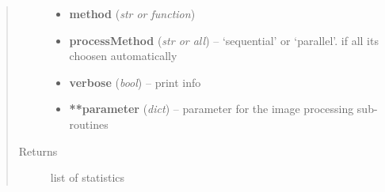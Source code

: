 \documentclass[letterpaper,10pt,english]{sphinxmanual}
\begin{document}
\begin{fulllineitems}
\begin{quote}
\begin{description}
\begin{itemize}
\item {} 
\textbf{method} (\emph{str or function})

\item {} 
\textbf{processMethod} (\emph{str or all}) --
`sequential' or `parallel'. if all its choosen automatically

\item {} 
\textbf{verbose} (\emph{bool}) --
print info

\item {} 
\textbf{**parameter} (\emph{dict}) --
parameter for the image processing sub-routines

\end{itemize}

\item[{Returns}] \leavevmode
list of statistics

\end{description}\end{quote}

\end{fulllineitems}

\end{document}
